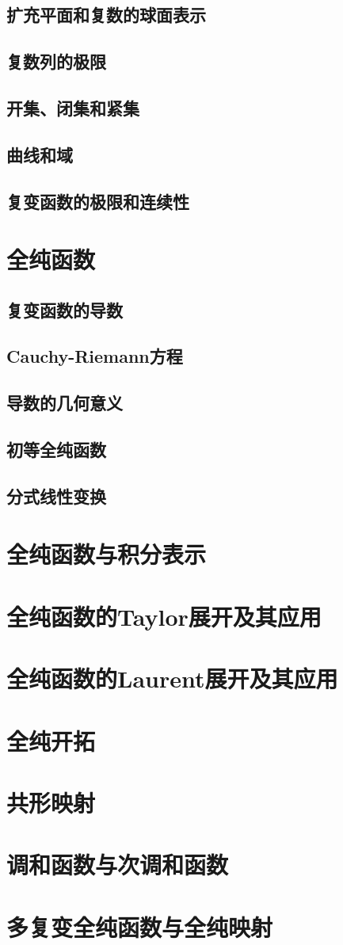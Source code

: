 \documentclass[12pt,fontset=none]{ctexbook}
\begin{document}
\newpage
\section{扩充平面和复数的球面表示}
\newpage
\section{复数列的极限}
\newpage
\section{开集、闭集和紧集}
\newpage
\section{曲线和域}
\newpage
\section{复变函数的极限和连续性}
\newpage


\chapter{全纯函数}
\newpage
\section{复变函数的导数}
\newpage
\section{Cauchy-Riemann方程}
\newpage
\section{导数的几何意义}
\newpage
\section{初等全纯函数}
\newpage
\section{分式线性变换}
\newpage

\chapter{全纯函数与积分表示}
\chapter{全纯函数的Taylor展开及其应用}
\chapter{全纯函数的Laurent展开及其应用}
\chapter{全纯开拓}
\chapter{共形映射}
\chapter{调和函数与次调和函数}
\chapter{多复变全纯函数与全纯映射}
\end{document}
